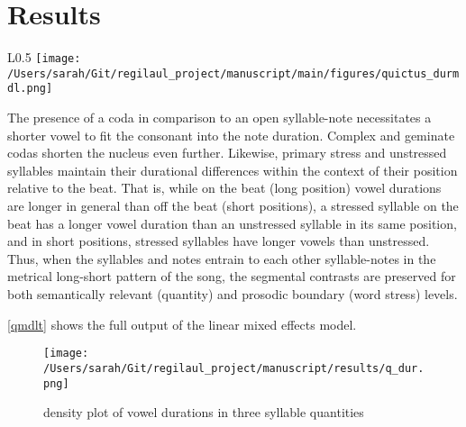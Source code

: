 \chapter{Results}
%

\begin{wrapfigure}{L}{0.5\textwidth}
\centering
\texttt{[image: /Users/sarah/Git/regilaul\_project/manuscript/main/figures/quictus\_durmdl.png]}
\caption{quantity model}
\label{qmdlt}


\end{wrapfigure}





The presence of a coda in comparison to an open syllable-note necessitates a shorter vowel to fit the consonant into the note duration. Complex and geminate codas shorten the nucleus even further. Likewise, primary stress and unstressed syllables maintain their durational differences within the context of their position relative to the beat. That is, while on the beat (long position) vowel durations are longer in general than off the beat (short positions), a stressed syllable on the beat has a longer vowel duration than an unstressed syllable in its same position, and in short positions, stressed syllables have longer vowels than unstressed. Thus, when the syllables and notes entrain to each other syllable-notes in the  metrical long-short pattern of the song, the segmental contrasts are preserved for both semantically relevant (quantity) and prosodic boundary (word stress) levels. 



\ref{qmdlt} shows the full output of the linear mixed effects model. 






\begin{figure}[ht]
\centering
\texttt{[image: /Users/sarah/Git/regilaul\_project/manuscript/results/q\_dur.png]}
\caption{density plot of vowel durations in three syllable quantities}
\label{qdur}

\end{figure}
%


